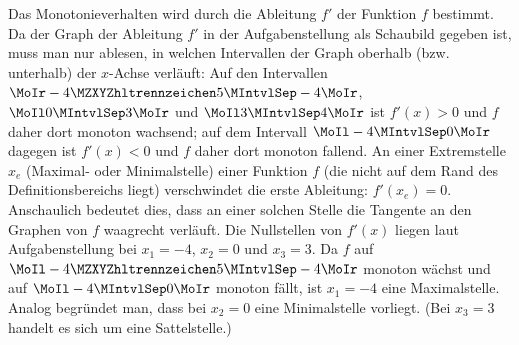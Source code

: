 \begin{MExercises}
\begin{MExercise}
\begin{MHint}{\iSolution}
 Das Monotonieverhalten wird durch die Ableitung $f'$ der Funktion $f$ bestimmt. Da der Graph der Ableitung $f'$ in der Aufgabenstellung
 als Schaubild gegeben ist, muss man nur ablesen, in welchen Intervallen der Graph oberhalb (bzw. unterhalb) der $x$-Achse verläuft:
 Auf den Intervallen $\MoIr -\MZahl{4}{5} \MIntvlSep -4\MoIr$, $\MoIl 0 \MIntvlSep 3\MoIr$ und $\MoIl 3 \MIntvlSep 4\MoIr$ ist $f'(x) > 0$ und $f$ daher dort monoton wachsend;
 auf dem Intervall $\MoIl -4 \MIntvlSep 0\MoIr$ dagegen ist $f'(x) < 0$ und $f$ daher dort monoton fallend.\newline
 An einer Extremstelle $x_e$ (Maximal- oder Minimalstelle) einer Funktion $f$ (die nicht auf dem Rand des Definitionsbereichs liegt)
 verschwindet die erste Ableitung: $f'(x_e) = 0$. Anschaulich bedeutet dies, dass an einer solchen Stelle die Tangente an den Graphen
 von $f$ waagrecht verläuft. Die Nullstellen von $f'(x)$ liegen laut Aufgabenstellung bei $x_ 1 = -4$, $x_2 = 0$ und $x_3 = 3$. Da $f$ auf
 $\MoIl -\MZahl{4}{5} \MIntvlSep -4\MoIr$ monoton wächst und auf $\MoIl -4 \MIntvlSep 0\MoIr$ monoton fällt, ist $x_1 = - 4$ eine Maximalstelle.
 Analog begründet man, dass bei $x_2 = 0$ eine Minimalstelle vorliegt. (Bei $x_3 = 3$ handelt es sich um eine Sattelstelle.)
\end{MHint}
\end{MExercise}
\end{MExercises}



